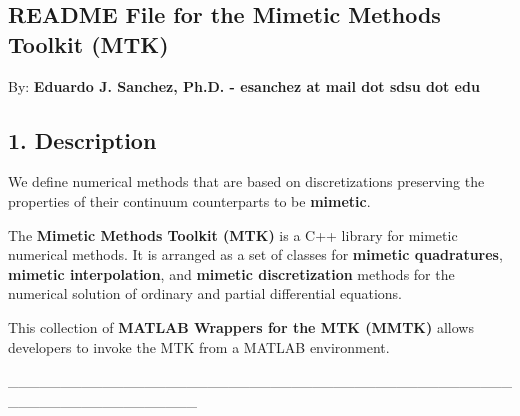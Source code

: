 
\begin{DoxyPre}
\section*{README File for the Mimetic Methods Toolkit (MTK)}\end{DoxyPre}



\begin{DoxyPre}\end{DoxyPre}



\begin{DoxyPre}By: {\bfseries Eduardo J. Sanchez, Ph.D. - esanchez at mail dot sdsu dot edu}


\end{DoxyPre}



\begin{DoxyPre}\subsection*{1. Description}\end{DoxyPre}



\begin{DoxyPre}\end{DoxyPre}



\begin{DoxyPre}We define numerical methods that are based on discretizations preserving the
properties of their continuum counterparts to be {\bfseries mimetic}.\end{DoxyPre}



\begin{DoxyPre}The {\bfseries Mimetic Methods Toolkit (MTK)} is a C++ library for mimetic numerical
methods. It is arranged as a set of classes for {\bfseries mimetic quadratures},
{\bfseries mimetic interpolation}, and {\bfseries mimetic discretization} methods for the
numerical solution of ordinary and partial differential equations.\end{DoxyPre}



\begin{DoxyPre}This collection of {\bfseries MATLAB Wrappers for the MTK (MMTK)} allows developers to
invoke the MTK from a MATLAB environment.
\begin{DoxyVerb}__________________________________________________________________
\end{DoxyVerb}
\end{DoxyPre}



